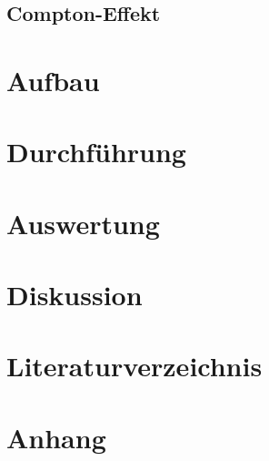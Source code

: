 \documentclass[12pt]{article}
\begin{document}
\subsection{Compton-Effekt}

\section{Aufbau}
\section{Durchführung}\label{sec:durchfuehrung}
\section{Auswertung}\label{sec:auswertung}
\section{Diskussion}\label{sec:diskussion}
\section{Literaturverzeichnis}\label{sec:literaturverzeichnis}
\printbibliography[heading = none]
\newpage

\section{Anhang}\label{sec:anhang}
\end{document}
